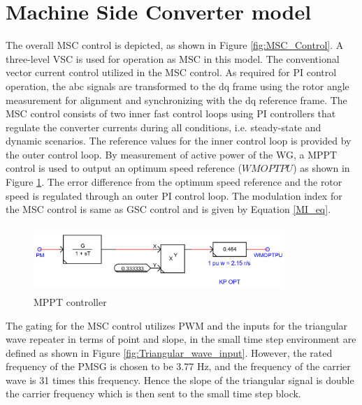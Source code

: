 \section{Machine Side Converter model}\label{MSC_Control}

The overall \gls{MSC} control is depicted, as shown in Figure \ref{fig:MSC_Control}. A three-level \gls{VSC} is used for operation as \gls{MSC} in this model. The conventional vector current control utilized in the \gls{MSC} control. As required for \gls{PI} control operation, the abc signals are transformed to the \gls{dq} frame using the rotor angle measurement for alignment and synchronizing with the \gls{dq} reference frame. The \gls{MSC} control consists of two inner fast control loops using \gls{PI} controllers that regulate the converter currents during all conditions, i.e. steady-state and dynamic scenarios. The reference values for the inner control loop is provided by the outer control loop. By measurement of active power of the \gls{WG}, a \gls{MPPT} control is used to output an optimum speed reference ($WMOPTPU$) as shown in Figure \ref{fig:MPPT_control}. The error difference from the optimum speed reference and the rotor speed is regulated through an outer \gls{PI} control loop. The modulation index for the \gls{MSC} control is same as \gls{GSC} control and is given by Equation \ref{MI_eq}.

\begin{figure}[H]
\centering
    \includegraphics[height = 2.5cm,width = 9.5cm]{Diagrams/Appendix_A/MPPT_control.PNG}
    \caption{MPPT controller}
    \label{fig:MPPT_control}
\end{figure}

The gating for the \gls{MSC} control utilizes \gls{PWM} and the inputs for the triangular wave repeater in terms of point and slope, in the small time step environment are defined as shown in Figure \ref{fig:Triangular_wave_input}. However, the rated frequency of the \gls{PMSG} is chosen to be 3.77 Hz, and the frequency of the carrier wave is 31 times this frequency. Hence the slope of the triangular signal is double the carrier frequency which is then sent to the small time step block.  

